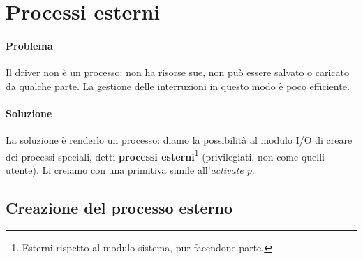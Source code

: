 \documentclass[11pt]{report}
\theoremstyle{definition}
\begin{document}
\section{Processi esterni}
\paragraph{Problema} Il driver non è un processo: non ha risorse sue, non può essere salvato o caricato da qualche parte. La gestione delle interruzioni in questo modo è poco efficiente.
\paragraph{Soluzione} {La soluzione è renderlo un processo}: diamo la possibilità al modulo I/O di creare dei processi speciali, detti \textbf{processi esterni}\footnote{Esterni rispetto al modulo sistema, pur facendone parte.} (privilegiati, non come quelli utente). Li creiamo con una primitiva simile all'\emph{activate$\_$p}.


\subsection{Creazione del processo esterno}
\end{document}
